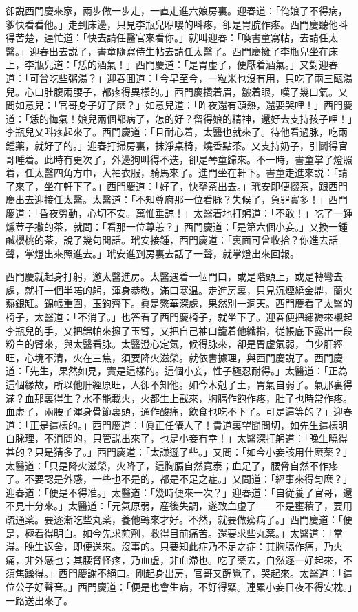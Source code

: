 卻説西門慶來家，兩步做一步走，一直走進六娘房裏。迎春道：「俺娘了不得病，爹快看看他。」走到床邊，只見李瓶兒咿嚶的呌疼，卻是胃脘作疼。西門慶聽他呌得苦楚，連忙道：「快去請任醫官來看你。」就叫迎春：「喚書童寫帖，去請任太醫。」迎春出去説了，書童隨寫侍生帖去請任太醫了。西門慶擁了李瓶兒坐在床上，李瓶兒道：「恁的酒氣！」西門慶道：「是胃虚了，便厭着酒氣。」又對迎春道：「可曾吃些粥湯？」迎春囬道：「今早至今，一粒米也沒有用，只吃了兩三甌湯兒。心口肚腹兩腰子，都疼得異樣的。」西門慶攢着眉，皺着眼，嘆了幾口氣。又問如意兒：「官哥身子好了麽？」如意兒道：「昨夜還有頭熱，還要哭哩！」西門慶道：「恁的悔氣！娘兒兩個都病了，怎的好？留得娘的精神，還好去支持孩子哩！」李瓶兒又呌疼起來了。西門慶道：「且耐心着，太醫也就來了。待他看過脉，吃兩鍾薬，就好了的。」迎春打掃房裏，抹淨桌椅，燒香點茶。又支持奶子，引鬬得官哥睡着。此時有更次了，外邊狗叫得不迭，卻是琴童歸來。不一時，書童掌了燈照着，任太醫四角方巾，大袖衣服，騎馬來了。進門坐在軒下。書童走進來説：「請了來了，坐在軒下了。」西門慶道：「好了，快拏茶出去。」玳安即便掇茶，跟西門慶出去迎接任太醫。太醫道：「不知尊府那一位看脉？失候了，負罪實多！」西門慶道：「昏夜勞動，心切不安。萬惟垂諒！」太醫着地打躬道：「不敢！」吃了一鍾燻荳子撒的茶，就問：「看那一位尊恙？」西門慶道：「是第六個小妾。」又換一鍾鹹櫻桃的茶，說了幾句閒話。玳安接鍾，西門慶道：「裏面可曾收拾？你進去話聲，掌燈出來照進去。」玳安進到房裏去話了一聲，就掌燈出來回報。

西門慶就起身打躬，邀太醫進房。太醫遇着一個門口，或是階頭上，或是轉彎去處，就打一個半喏的躬，渾身恭敬，滿口寒温。走進房裏，只見沉煙繞金鼎，蘭火爇銀缸。錦帳重圍，玉鉤齊下。眞是繁華深處，果然別一洞天。西門慶看了太醫的椅子，太醫道：「不消了。」也答看了西門慶椅子，就坐下了。迎春便把繡褥來襯起李瓶兒的手，又把錦帕來擁了玉臂，又把自己袖口籠着他纖指，従帳底下露出一段粉白的臂來，與太醫看脉。太醫澄心定氣，候得脉來，卻是胃虚氣弱，血少肝經旺，心境不清，火在三焦，須要降火滋榮。就依書據理，與西門慶説了。西門慶道：「先生，果然如見，實是這樣的。這個小妾，性子極忍耐得。」太醫道：「正為這個緣故，所以他肝經原旺，人卻不知他。如今木尅了土，胃氣自弱了。氣那裏得滿？血那裏得生？水不能載火，火都生上截來，胸膈作飽作疼，肚子也時常作疼。血虚了，兩腰子渾身骨節裏頭，通作酸痛，飲食也吃不下了。可是這等的？」迎春道：「正是這樣的。」西門慶道：「眞正任僊人了！貴道裏望聞問切，如先生這樣明白脉理，不消問的，只管説出來了，也是小妾有幸！」太醫深打躬道：「晚生曉得甚的？只是猜多了。」西門慶道：「太謙遜了些。」又問：「如今小妾該用什麽薬？」太醫道：「只是降火滋榮，火降了，這胸膈自然寬泰；血足了，腰脅自然不作疼了。不要認是外感，一些也不是的，都是不足之症。」又問道：「經事來得匀麽？」迎春道：「便是不得准。」太醫道：「幾時便來一次？」迎春道：「自従養了官哥，還不見十分來。」太醫道：「元氣原弱，産後失調，遂致血虚了——不是壅積了，要用疏通薬。要逐漸吃些丸薬，養他轉來才好。不然，就要做癆病了。」西門慶道：「便是，極看得明白。如今先求煎劑，救得目前痛苦。還要求些丸薬。」太醫道：「當淂。晚生返舍，即便送來。沒事的。只要知此症乃不足之症：其胸膈作痛，乃火痛，非外感也；其腰脅怪疼，乃血虚，非血滯也。吃了薬去，自然逐一好起來，不須焦躁得。」西門慶謝不絕口。剛起身出房，官哥又醒覺了，哭起來。太醫道：「這位公子好聲音。」西門慶道：「便是也會生病，不好得緊。連累小妾日夜不得安枕。」一路送出來了。

